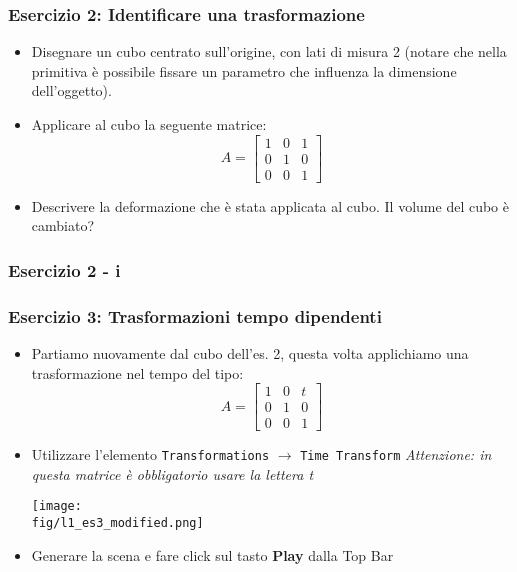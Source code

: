 \documentclass{beamer}
\newcommand{\fig}{figures}
\begin{document}
\begin{frame}
\frametitle{Esercizio 2: Identificare una trasformazione}
\begin{itemize}
\item Disegnare un  cubo centrato sull'origine, con lati di misura 2 (notare
che nella primitiva \`e possibile fissare un parametro che influenza la
dimensione dell'oggetto).  
\item Applicare al cubo la seguente matrice: 
\begin{displaymath}
A = \begin{bmatrix}
    1 & 0 & 1\\
    0 & 1 & 0\\
    0 & 0 & 1
    \end{bmatrix}
\end{displaymath}
\item Descrivere la deformazione che \`e stata applicata al cubo. Il volume del cubo \`e cambiato?
\end{itemize}
\end{frame}
%
\begin{frame}
\frametitle{Esercizio 2 - i}
\begin{center}
\end{center}
\end{frame}
\begin{frame}
\frametitle{Esercizio 3: Trasformazioni tempo dipendenti}
    \vspace{-0.5cm}
\begin{itemize}
\item Partiamo nuovamente dal cubo dell'es. 2, questa volta applichiamo una trasformazione nel tempo del tipo:
\begin{displaymath}
A = \begin{bmatrix}
    1 & 0 & t \\
    0 & 1 & 0 \\
    0 & 0 & 1
    \end{bmatrix}
\end{displaymath}
\item Utilizzare l'elemento \texttt{Transformations} $\rightarrow$ \texttt{Time Transform}
    \textit{Attenzione: in questa matrice \`e obbligatorio usare la lettera t} \\
        \begin{center}
    \texttt{[image: \\fig/l1\_es3\_modified.png]}
        \end{center}
\item Generare la scena e fare click sul tasto \textbf{Play} dalla Top Bar
\end{itemize}
\end{frame}
\end{document}
